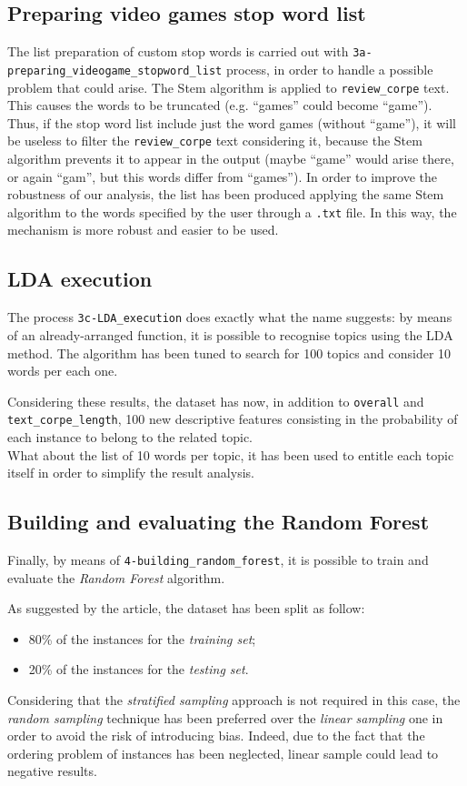 \documentclass[a4paper]{article}
\begin{document}
 		\subsection{Preparing video games stop word list}
		 	The list preparation of custom stop words is carried out with \verb*|3a-preparing_videogame_stopword_list| process, in order to handle a possible problem that could arise. The Stem algorithm is applied to \verb*|review_corpe| text. This causes the words to be truncated (e.g. ``games'' could become ``game''). Thus, if the stop word list include just the word games (without ``game''), it will be useless to filter the \verb*|review_corpe| text considering it, because the Stem algorithm prevents it to appear in the output (maybe ``game'' would arise there, or again ``gam'', but this words differ from ``games''). In order to improve the robustness of our analysis, the list has been produced applying the same Stem algorithm to the words specified by the user through a \verb*|.txt| file. In this way, the mechanism is more robust and easier to be used.
		 	
		 \subsection{LDA execution}
		 	The process \verb*|3c-LDA_execution| does exactly what the name suggests: by means of an already-arranged function, it is possible to recognise topics using the LDA method. The algorithm has been tuned to search for 100 topics and consider 10 words per each one.
		 	
		 	Considering these results, the dataset has now, in addition to \verb*|overall| and \verb*|text_corpe_length|, 100 new descriptive features consisting in the probability of each instance to belong to the related topic.\\
		 	What about the list of 10 words per topic, it has been used to entitle each topic itself in order to simplify the result analysis.
		 	
		 \subsection{Building and evaluating the Random Forest}
		 	Finally, by means of \verb*|4-building_random_forest|, it is possible to train and evaluate the \emph{Random Forest} algorithm. 
		 	
		 	As suggested by the article, the dataset has been split as follow:
		 	\begin{itemize}
			 	\item 80\% of the instances for the \emph{training set};
			 	\item 20\% of the instances for the \emph{testing set}.
		 	\end{itemize}
	 		Considering that the \emph{stratified sampling} approach is not required in this case, the \emph{random sampling} technique has been preferred over the \emph{linear sampling} one in order to avoid the risk of introducing bias. Indeed, due to the fact that the ordering problem of instances has been neglected, linear sample could lead to negative results.
	 		
\end{document}
